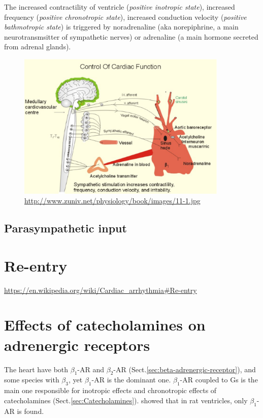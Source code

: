 The increased contractility of ventricle ({\it positive inotropic state}),
increased frequency ({\it positive chronotropic state}), increased conduction
velocity ({\it positive bathmotropic state}) is triggered by noradrenaline (aka
norepiphrine, a main neurotransmsitter of sympathetic nerves) or adrenaline (a
main hormone secreted from adrenal glands).


\begin{figure}[hbt]
 \centerline{\includegraphics[height=7cm]{./images/signal2heart.eps}}
 \caption{\url{http://www.zuniv.net/physiology/book/images/11-1.jpg}}
\label{fig:signal2heart}
\end{figure}

\subsection{Parasympathetic input}



\section{Re-entry}
\label{sec:re-entry}


\url{https://en.wikipedia.org/wiki/Cardiac_arrhythmia#Re-entry}


\section{Effects of catecholamines on adrenergic receptors}

The heart have both $\beta_1$-AR and $\beta_2$-AR
(Sect.\ref{sec:beta-adrenergic-receptor}), and some species with $\beta_3$, yet
$\beta_1$-AR is the dominant one. $\beta_1$-AR coupled to Gs is the main one
responsible for inotropic effects and chronotropic effects of catecholamines
(Sect.\ref{sec:Catecholamines}).
\citep{Buxton1985} showed that in rat ventricles, only $\beta_1$-AR is found.

